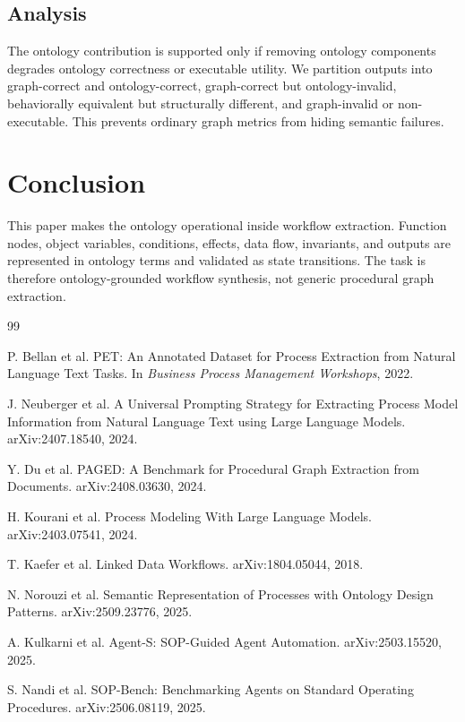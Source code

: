 \documentclass[10pt,twocolumn]{article}
\begin{document}
\subsection{Analysis}
The ontology contribution is supported only if removing ontology components degrades ontology correctness or executable utility. We partition outputs into graph-correct and ontology-correct, graph-correct but ontology-invalid, behaviorally equivalent but structurally different, and graph-invalid or non-executable. This prevents ordinary graph metrics from hiding semantic failures.

\section{Conclusion}
This paper makes the ontology operational inside workflow extraction. Function nodes, object variables, conditions, effects, data flow, invariants, and outputs are represented in ontology terms and validated as state transitions. The task is therefore ontology-grounded workflow synthesis, not generic procedural graph extraction.

\begin{thebibliography}{99}

P. Bellan et al.
\newblock PET: An Annotated Dataset for Process Extraction from Natural Language Text Tasks.
\newblock In \emph{Business Process Management Workshops}, 2022.

J. Neuberger et al.
\newblock A Universal Prompting Strategy for Extracting Process Model Information from Natural Language Text using Large Language Models.
\newblock arXiv:2407.18540, 2024.

Y. Du et al.
\newblock PAGED: A Benchmark for Procedural Graph Extraction from Documents.
\newblock arXiv:2408.03630, 2024.

H. Kourani et al.
\newblock Process Modeling With Large Language Models.
\newblock arXiv:2403.07541, 2024.

T. Kaefer et al.
\newblock Linked Data Workflows.
\newblock arXiv:1804.05044, 2018.

N. Norouzi et al.
\newblock Semantic Representation of Processes with Ontology Design Patterns.
\newblock arXiv:2509.23776, 2025.

A. Kulkarni et al.
\newblock Agent-S: SOP-Guided Agent Automation.
\newblock arXiv:2503.15520, 2025.

S. Nandi et al.
\newblock SOP-Bench: Benchmarking Agents on Standard Operating Procedures.
\newblock arXiv:2506.08119, 2025.

\end{thebibliography}
\end{document}

